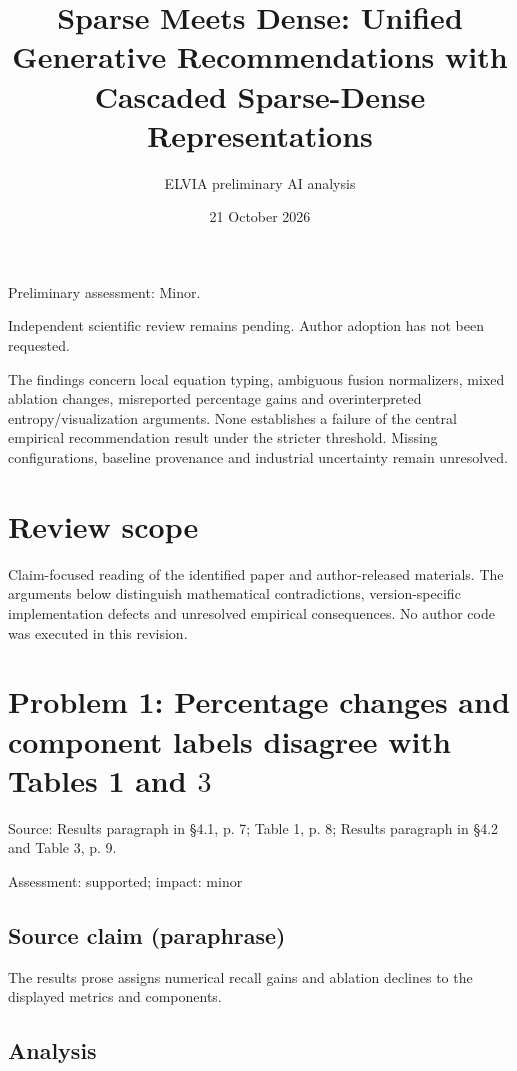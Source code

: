 \documentclass[11pt]{article}
\begin{document}
\title{Sparse Meets Dense: Unified Generative Recommendations with Cascaded Sparse-Dense Representations}

\author{ELVIA preliminary AI analysis}\date{21 October 2026}\maketitle

Preliminary assessment: Minor.\par

Independent scientific review remains pending. Author adoption has not been requested.

The findings concern local equation typing, ambiguous fusion normalizers, mixed ablation changes, misreported percentage gains and overinterpreted entropy/visualization arguments. None establishes a failure of the central empirical recommendation result under the stricter threshold. Missing configurations, baseline provenance and industrial uncertainty remain unresolved.

\section*{Review scope}

Claim-focused reading of the identified paper and author-released materials. The arguments below distinguish mathematical contradictions, version-specific implementation defects and unresolved empirical consequences. No author code was executed in this revision.

\section*{Problem 1: Percentage changes and component labels disagree with Tables 1 and \(3\)}

Source: Results paragraph in §4.1, p. 7; Table 1, p. 8; Results paragraph in §4.2 and Table 3, p. 9.

Assessment: supported; impact: minor

\subsection*{Source claim (paraphrase)}

The results prose assigns numerical recall gains and ablation declines to the displayed metrics and components.

\subsection*{Analysis}
\end{document}
